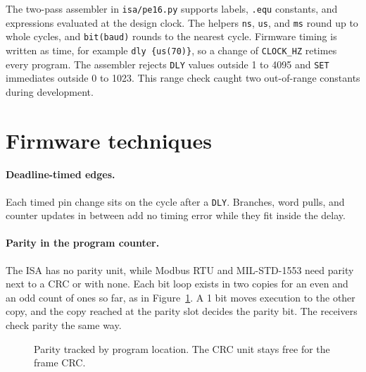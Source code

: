 \documentclass[11pt]{article}
\begin{document}
The two-pass assembler in \texttt{isa/pe16.py} supports labels, \texttt{.equ} constants, and expressions evaluated at the design clock.
The helpers \texttt{ns}, \texttt{us}, and \texttt{ms} round up to whole cycles, and \texttt{bit(baud)} rounds to the nearest cycle.
Firmware timing is written as time, for example \texttt{dly \{us(70)\}}, so a change of \texttt{CLOCK\_HZ} retimes every program.
The assembler rejects \texttt{DLY} values outside 1 to 4095 and \texttt{SET} immediates outside 0 to 1023.
This range check caught two out-of-range constants during development.

\section{Firmware techniques}

\paragraph{Deadline-timed edges.}
Each timed pin change sits on the cycle after a \texttt{DLY}.
Branches, word pulls, and counter updates in between add no timing error while they fit inside the delay.

\paragraph{Parity in the program counter.}
The ISA has no parity unit, while Modbus RTU and MIL-STD-1553 need parity next to a CRC or with none.
Each bit loop exists in two copies for an even and an odd count of ones so far, as in Figure~\ref{fig:parity}.
A 1 bit moves execution to the other copy, and the copy reached at the parity slot decides the parity bit.
The receivers check parity the same way.

\begin{figure}[h]
\centering
{}
\caption{Parity tracked by program location. The CRC unit stays free for the frame CRC.}
\label{fig:parity}
\end{figure}
\end{document}
